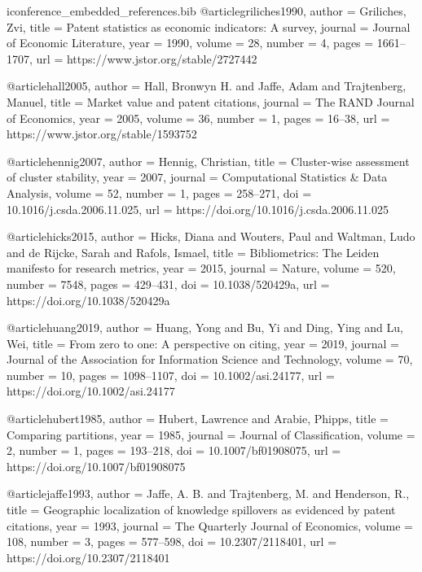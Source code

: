 \begin{filecontents*}[overwrite]{iconference_embedded_references.bib}
@article{griliches1990,
  author = {Griliches, Zvi},
  title = {Patent statistics as economic indicators: A survey},
  journal = {Journal of Economic Literature},
  year = {1990},
  volume = {28},
  number = {4},
  pages = {1661--1707},
  url = {https://www.jstor.org/stable/2727442}
}

@article{hall2005,
  author = {Hall, Bronwyn H. and Jaffe, Adam and Trajtenberg, Manuel},
  title = {Market value and patent citations},
  journal = {The RAND Journal of Economics},
  year = {2005},
  volume = {36},
  number = {1},
  pages = {16--38},
  url = {https://www.jstor.org/stable/1593752}
}

@article{hennig2007,
  author = {Hennig, Christian},
  title = {Cluster-wise assessment of cluster stability},
  year = {2007},
  journal = {Computational Statistics \& Data Analysis},
  volume = {52},
  number = {1},
  pages = {258--271},
  doi = {10.1016/j.csda.2006.11.025},
  url = {https://doi.org/10.1016/j.csda.2006.11.025}
}

@article{hicks2015,
  author = {Hicks, Diana and Wouters, Paul and Waltman, Ludo and de Rijcke, Sarah and Rafols, Ismael},
  title = {Bibliometrics: The {Leiden} manifesto for research metrics},
  year = {2015},
  journal = {Nature},
  volume = {520},
  number = {7548},
  pages = {429--431},
  doi = {10.1038/520429a},
  url = {https://doi.org/10.1038/520429a}
}

@article{huang2019,
  author = {Huang, Yong and Bu, Yi and Ding, Ying and Lu, Wei},
  title = {From zero to one: A perspective on citing},
  year = {2019},
  journal = {Journal of the Association for Information Science and Technology},
  volume = {70},
  number = {10},
  pages = {1098--1107},
  doi = {10.1002/asi.24177},
  url = {https://doi.org/10.1002/asi.24177}
}

@article{hubert1985,
  author = {Hubert, Lawrence and Arabie, Phipps},
  title = {Comparing partitions},
  year = {1985},
  journal = {Journal of Classification},
  volume = {2},
  number = {1},
  pages = {193--218},
  doi = {10.1007/bf01908075},
  url = {https://doi.org/10.1007/bf01908075}
}

@article{jaffe1993,
  author = {Jaffe, A. B. and Trajtenberg, M. and Henderson, R.},
  title = {Geographic localization of knowledge spillovers as evidenced by patent citations},
  year = {1993},
  journal = {The Quarterly Journal of Economics},
  volume = {108},
  number = {3},
  pages = {577--598},
  doi = {10.2307/2118401},
  url = {https://doi.org/10.2307/2118401}
}


\end{filecontents*}
